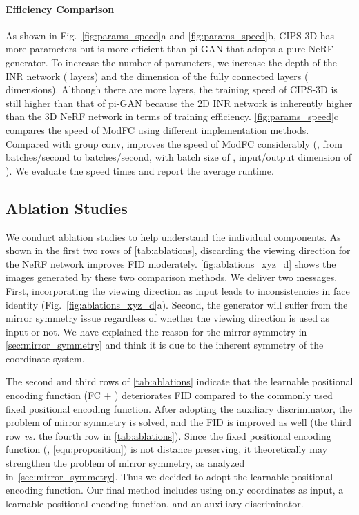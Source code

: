 \documentclass[10pt,twocolumn,letterpaper]{article}
\begin{document}
\paragraph{Efficiency Comparison}
As shown in Fig.~\ref{fig:params_speed}a and \ref{fig:params_speed}b, CIPS-3D has more parameters but is more efficient than pi-GAN that adopts a pure NeRF generator. To increase the number of parameters, we increase the depth of the INR network ( layers) and the dimension of the fully connected layers ( dimensions). Although there are more layers, the training speed of CIPS-3D is still higher than that of pi-GAN because the 2D INR network is inherently higher than the 3D NeRF network in terms of training efficiency. \cref{fig:params_speed}c compares the speed of ModFC using different implementation methods. Compared with group conv,  improves the speed of ModFC considerably (\ie, from  batches/second to  batches/second, with batch size of , input/output dimension of ). We evaluate the speed  times and report the average runtime.














\subsection{Ablation Studies}
\label{sec:exp:ablation}

We conduct ablation studies to help understand the individual components. As shown in the first two rows of \cref{tab:ablations}, discarding the viewing direction  for the NeRF network improves FID moderately. \cref{fig:ablations_xyz_d} shows the images generated by these two comparison methods. We deliver two messages. First, incorporating the viewing direction  as input leads to inconsistencies in face identity (Fig.~\ref{fig:ablations_xyz_d}a). Second, the generator will suffer from the mirror symmetry issue regardless of whether the viewing direction  is used as input or not. We have explained the reason for the mirror symmetry in \cref{sec:mirror_symmetry} and think it is due to the inherent symmetry of the coordinate system.

The second and third rows of \cref{tab:ablations} indicate that the learnable positional encoding function (FC + ) deteriorates FID compared to the commonly used fixed positional encoding function. After adopting the auxiliary discriminator, the problem of mirror symmetry is solved, and the FID is improved as well (the third row \textit{vs.} the fourth row in \cref{tab:ablations}). Since the fixed positional encoding function (\ie, \cref{equ:proposition}) is not distance preserving, it theoretically may strengthen the problem of mirror symmetry, as analyzed in~\cref{sec:mirror_symmetry}. Thus we decided to adopt the learnable positional encoding function. Our final method includes using only coordinates as input, a learnable positional encoding function, and an auxiliary discriminator.
\end{document}
